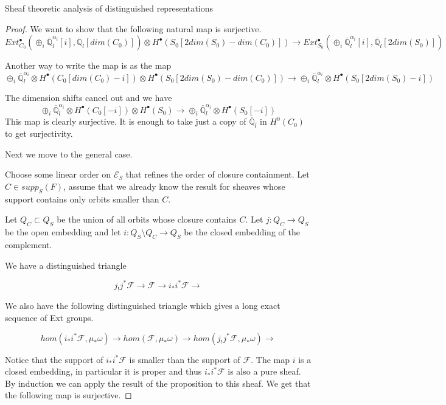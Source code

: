 \documentclass[12pt]{article}
\newcommand{\Q}{\mathbb{Q}}
\newcommand{\<}{\langle}
\renewcommand{\>}{\rangle}
\theoremstyle{plain}
\theoremstyle{definition}
\begin{document}
\begin{section}{Sheaf theoretic analysis of distinguished representations}
\begin{proof}
    We want to show that the following natural map is surjective.
$$Ext_{C_0}^\bullet(\oplus_i\overline{\Q}_l^{\alpha_i}[i],\overline{\Q}_l[dim(C_0)])\otimes H^\bullet(S_0[2dim(S_0)-dim(C_0)])\rightarrow Ext_{S_0}^\bullet(\oplus_i \overline{\Q}_l^{\alpha_i}[i],\overline{\Q}_l[2dim(S_0)])$$ 

    Another way to write the map is as the map $$\oplus_i \overline{\Q}_l^{\alpha_i}\otimes H^\bullet(C_0[dim(C_0)-i])\otimes H^\bullet(S_0[2dim(S_0)-dim(C_0)])\rightarrow \oplus_i \overline{\Q}_l^{\alpha_i}\otimes H^\bullet(S_0[2dim(S_0)-i])$$

    The dimension shifts cancel out and we have $$\oplus_i \overline{\Q}_l^{\alpha_i}\otimes H^\bullet(C_0[-i])\otimes H^\bullet(S_0)\rightarrow \oplus_i \overline{\Q}_l^{\alpha_i}\otimes H^\bullet(S_0[-i])$$ This map is clearly surjective. It is enough to take just a copy of $\overline{\Q}_l$ in $H^0(C_0)$ to get surjectivity.

    Next we move to the general case. 

    Choose some linear order on $\mathcal{E}_S$ that refines the order of closure containment. Let $C\in supp_S(F)$, assume that we already know the result for sheaves whose support contains only orbits smaller than $C$.

    Let $Q_C\subset Q_S$ be the union of all orbits whose closure contains $C$. Let $j:Q_C\rightarrow Q_S$ be the open embedding and let $i:Q_S\setminus Q_C\rightarrow Q_S$ be the closed embedding of the complement. 

    We have a distinguished triangle

    $$j_!j^*\mathcal{F}\rightarrow \mathcal{F}\rightarrow i_*i^*\mathcal{F}\rightarrow$$


    We also have the following distinguished triangle which gives a long exact sequence of Ext groups.

    $$hom(i_*i^*\mathcal{F},\mu_*\omega)\rightarrow hom(\mathcal{F},\mu_*\omega) \rightarrow hom(j_!j^*\mathcal{F},\mu_*\omega) \rightarrow$$


    Notice that the support of $i_*i^*\mathcal{F}$ is smaller than the support of $\mathcal{F}$. The map $i$ is a closed embedding, in particular it is proper and thus $i_*i^*\mathcal{F}$ is also a pure sheaf.  By induction we can apply the result of the proposition to this sheaf. We get that the following  map is surjective. 
    

\end{proof}
\end{section}
\end{document}

